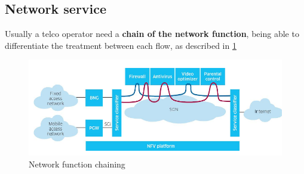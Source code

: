 \documentclass[10pt,a4paper]{report}
\theoremstyle{definition}
\begin{document}
\subsection{Network service}\label{sec:network-service}
Usually a telco operator need a \textbf{chain of the network function}, being able to differentiate the treatment between each flow, as described in \ref{flow-services}

\begin{figure}[h]
	\centering\includegraphics[scale=0.50]{images/Pasted image 20230405165919.png}
	\caption{Network function chaining}
\label{flow-services}
\end{figure}
\end{document}

